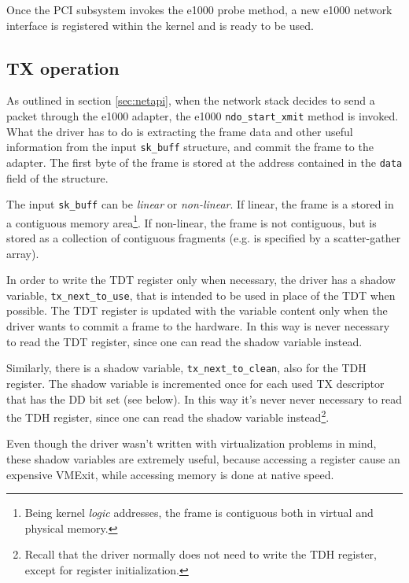 Once the PCI subsystem invokes the e1000 probe method, a new e1000 network interface is registered within the kernel and is ready to be
used.


\subsection{TX operation}
\label{sec:txdriver}
As outlined in section \ref{sec:netapi}, when the network stack decides to send a packet through the e1000 adapter, the e1000
\texttt{ndo\_start\_xmit} method is invoked. What the driver has to do is extracting the frame data and other useful information from the 
input \texttt{sk\_buff} structure, and commit the frame to the adapter. The first byte of the frame is stored at the address contained
in the \texttt{data} field of the structure.

The input \texttt{sk\_buff} can be \emph{linear} or \emph{non-linear}. If linear, the frame is a stored in a contiguous memory
area\footnote{Being kernel \emph{logic} addresses, the frame is contiguous both in virtual and physical memory.}.
If non-linear, the frame is not contiguous, but is stored as a collection of contiguous fragments (e.g. is specified by a scatter-gather
array).

\vspace{0.5cm}

In order to write the TDT register only when necessary, the driver has a shadow variable, \texttt{tx\_next\_to\_use}, that is intended to
be used in place of the TDT when possible. The TDT register is updated with the variable content only when the driver wants to commit a 
frame to the hardware. In this way is never necessary to read the TDT register, since one can read the shadow variable instead.

Similarly, there is a shadow variable, \texttt{tx\_next\_to\_clean}, also for the TDH register. The shadow variable is incremented
once for each used TX descriptor that has the DD bit set (see below). In this way it's never never necessary
to read the TDH register, since one can read the shadow variable instead\footnote{Recall that
the driver normally does not need to write the TDH register, except for register initialization.}.

Even though the driver wasn't written with virtualization problems in mind, these shadow variables are extremely useful, because 
accessing a register cause an expensive VMExit, while accessing memory is done at native speed.

\vspace{0.5cm}

